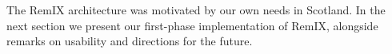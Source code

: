 The RemIX architecture was motivated by our own needs in Scotland. In
the next section we present our first-phase implementation of RemIX,
alongside remarks on usability and directions for the future.

